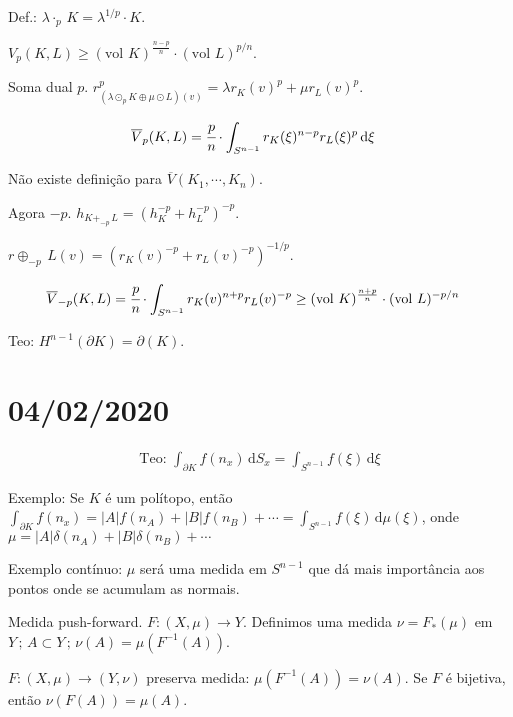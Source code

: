 \documentclass[12pt]{article}
\begin{document}
Def.: $\lambda \cdot_p\,K = \lambda^{1/p}\cdot K$.

$V_p(K, L) \ge (\text{vol }K)^{\frac{n-p}{n}}\cdot (\text{vol }L)^{p/n}$.

Soma dual $p$. $r_{(\lambda \odot_p K \oplus \mu \odot L)(v)}^p = \lambda r_K(v)^p + \mu r_L(v)^p$.

\vspace{100mm}

\begin{align}
\overline{V}_p(K, L) &= \cfrac{p}{n}\cdot \int_{S^{n - 1}} r_K(\xi)^{n - p} r_L(\xi)^p\,\mathrm{d}\xi
\end{align}

N\~ao existe defini\c{c}\~ao para $\overline{V}(K_1, \cdots, K_n)$.

Agora $-p$. $h_{K +_{-p}\,L} = (h_K^{-p} + h_L^{-p})^{-p}$.

$r \oplus_{-p}\,L(v) = (r_K(v)^{-p} + r_L(v)^{-p})^{-1/p}$.

\begin{align}
\overline{V}_{-p}(K, L) &= \cfrac{p}{n}\cdot\int_{S^{n - 1}} r_K(v)^{n + p} r_L(v)^{-p} \ge (\text{vol }K)^{\frac{n+p}{n}}\cdot(\text{vol }L)^{-p/n}
\end{align}

Teo: $H^{n - 1}(\partial K) = \partial (K)$.

\section{04/02/2020}

\begin{flushright}
\end{flushright}

\begin{align}
\text{Teo: }\int_{\partial K} f(n_x)\,\mathrm{d}S_x = \int_{S^{n - 1}} f(\xi)\,\mathrm{d}\xi
\end{align}

Exemplo: Se $K$ \'e um pol\'itopo, ent\~ao $\int_{\partial K} f(n_x) = |A|f(n_A) + |B|f(n_B) + \cdots = \int_{S^{n - 1}} f(\xi)\,\mathrm{d}\mu(\xi)$, onde $\mu = |A|\delta(n_A) + |B|\delta(n_B) + \cdots$

Exemplo cont\'inuo: $\mu$ ser\'a uma medida em $S^{n - 1}$ que d\'a mais import\^ancia aos pontos onde se acumulam as normais.

Medida push-forward. $F: (X,\mu) \to Y$. Definimos uma medida $\nu = F_*(\mu)$ em $Y\,;\,A \subset Y\,;\,\nu(A) = \mu(F^{-1}(A))$.

$F: (X,\mu) \to (Y, \nu)$ preserva medida: $\mu(F^{-1}(A)) = \nu(A)$. Se $F$ \'e bijetiva, ent\~ao $\nu(F(A)) = \mu(A)$.
\end{document}
